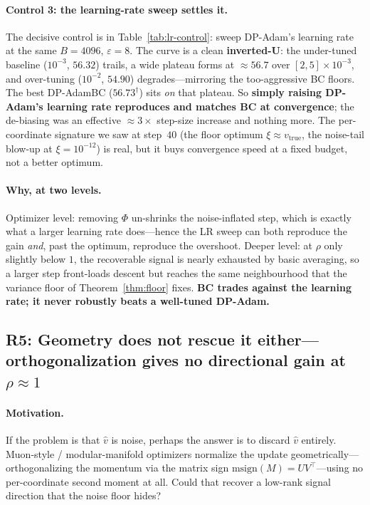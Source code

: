 \documentclass[11pt]{article}
\theoremstyle{plain}
\theoremstyle{definition}
\theoremstyle{remark}
\begin{document}
\paragraph{Control 3: the learning-rate sweep settles it.}
The decisive control is in Table~\ref{tab:lr-control}: sweep DP-Adam's learning rate at the same
$B{=}4096$, $\varepsilon{=}8$. The curve is a clean \textbf{inverted-U}: the under-tuned baseline
($10^{-3}$, $56.32$) trails, a wide plateau forms at $\mathbf{\approx 56.7}$ over $[2,5]\times10^{-3}$,
and over-tuning ($10^{-2}$, $54.90$) degrades---mirroring the too-aggressive BC floors. The best
DP-AdamBC ($56.73^{\dagger}$) sits \emph{on} that plateau. So \textbf{simply raising DP-Adam's
learning rate reproduces and matches BC at convergence}; the de-biasing was an effective $\approx3\times$
step-size increase and nothing more. The per-coordinate signature we saw at step~$40$ (the floor
optimum $\xi\approx v_{\mathrm{true}}$, the noise-tail blow-up at $\xi{=}10^{-12}$) is real, but it
buys convergence speed at a fixed budget, not a better optimum.

\paragraph{Why, at two levels.}
Optimizer level: removing $\Phi$ un-shrinks the noise-inflated step, which is exactly what a larger
learning rate does---hence the LR sweep can both reproduce the gain \emph{and}, past the optimum,
reproduce the overshoot. Deeper level: at $\rho$ only slightly below $1$, the recoverable signal is
nearly exhausted by basic averaging, so a larger step front-loads descent but reaches the same
neighbourhood that the variance floor of Theorem~\ref{thm:floor} fixes. \textbf{BC trades against
the learning rate; it never robustly beats a well-tuned DP-Adam.}

\subsection{R5: Geometry does not rescue it either---orthogonalization gives no directional gain at \texorpdfstring{$\rho\approx 1$}{rho approx 1}}
\label{sec:r5}

\paragraph{Motivation.}
If the problem is that $\hat v$ is noise, perhaps the answer is to discard $\hat v$ entirely.
Muon-style / modular-manifold optimizers normalize the update geometrically---orthogonalizing the
momentum via the matrix sign $\mathrm{msign}(M)=UV^\top$---using no per-coordinate second moment at
all. Could that recover a low-rank signal direction that the noise floor hides?
\end{document}

